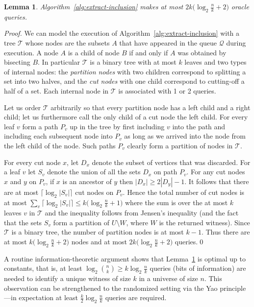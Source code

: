 \documentclass[11pt]{article}
\newtheorem{lemma}[theorem]{Lemma}
\begin{document}
\begin{lemma}
\label{lem:deterministic-extraction}
Algorithm~\ref{alg:extract-inclusion} makes at most 
$2k\bigl(\log_2\frac{n}{k}+2\bigr)$ oracle queries.
\end{lemma}

\begin{proof}
We can model the execution of Algorithm~\ref{alg:extract-inclusion} with a 
tree $\mathcal{T}$ whose nodes are the subsets $A$ that have appeared in the queue $\mathcal{Q}$ during execution. A node $A$ is a child of node $B$ if and only if $A$ was obtained by bisecting $B$. In particular $\mathcal{T}$ is a binary tree with at most $k$ leaves and two types of internal nodes: the {\em partition nodes} with two children correspond to splitting a set into two halves, and the {\em cut nodes} with one child correspond to cutting-off a half of a set. Each internal node in $\mathcal{T}$ is associated with 1 or 2 queries. 

Let us order $\mathcal{T}$ arbitrarily so that every partition node has a left child and a right child; let us furthermore call the only child of a cut node the left child. 
For every leaf $v$ form a path $P_v$ up in the tree by first including $v$ into the path and including each subsequent node into $P_v$ as long as we arrived into the node from the left child of the node. Such paths $P_v$ clearly form a partition of nodes in $\mathcal{T}$.

For every cut node $x$, let $D_x$ denote the subset of vertices that was
discarded. For a leaf $v$ let $S_v$ denote the union of all the sets $D_x$ 
on path $P_v$. For any cut nodes $x$ and $y$ on $P_v$, if $x$ is an ancestor 
of $y$ then $|D_x|\geq 2|D_y|-1$.
It follows that there are at most $\lceil\log_2 |S_v| \rceil $ cut nodes 
on $P_v$. Hence the total number of cut nodes is at most 
$\sum_v \lceil\log_2 |S_v|\rceil \le k\bigl(\log_2\frac{n}{k}+1\bigr)$ 
where the sum is over the at most $k$ leaves $v$ in $\mathcal{T}$ and 
the inequality follows from Jensen's inequality (and the fact that 
the sets $S_v$ form a partition of $U\setminus W$, where $W$ is the 
returned witness). Since $\mathcal{T}$ is a binary tree, 
the number of partition nodes is at most $k-1$. Thus there are 
at most $k\bigl(\log_2\frac{n}{k}+2\bigr)$ nodes and 
at most $2k\bigl(\log_2\frac{n}{k}+2\bigr)$ queries.\qed
\end{proof}

A routine information-theoretic argument shows that 
Lemma~\ref{lem:deterministic-extraction} is optimal up to constants,
that is, at least $\log_2\binom{n}{k}\geq k\log_2\frac{n}{k}$ queries 
(bits of information) are needed to identify a unique witness of size $k$ 
in a universe of size $n$. This observation can be strengthened to
the randomized setting via the Yao principle---in expectation at least $\frac{k}{2}\log_2\frac{n}{k}$ queries are required.
\end{document}
